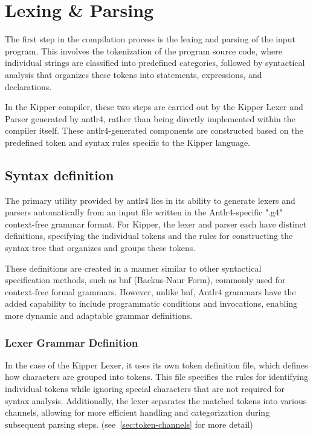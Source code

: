 \section{Lexing \& Parsing}
\label{sec:lexing-parsing}

The first step in the compilation process is the lexing and parsing of the input program. This involves the tokenization of the program source code, where individual strings are classified into predefined categories, followed by syntactical analysis that organizes these tokens into statements, expressions, and declarations.

In the Kipper compiler, these two steps are carried out by the Kipper Lexer and Parser generated by \Gls{antlr4}, rather than being directly implemented within the compiler itself. These \Gls{antlr4}-generated components are constructed based on the predefined token and syntax rules specific to the Kipper language.

\subsection{Syntax definition}

The primary utility provided by \Gls{antlr4} lies in its ability to generate lexers and parsers automatically from an input file written in the Antlr4-specific ".g4" context-free grammar format. For Kipper, the lexer and parser each have distinct definitions, specifying the individual tokens and the rules for constructing the syntax tree that organizes and groups these tokens.

These definitions are created in a manner similar to other syntactical specification methods, such as \acrshort{bnf} (Backus-Naur Form), commonly used for context-free formal grammars. However, unlike \acrshort{bnf}, Antlr4 grammars have the added capability to include programmatic conditions and invocations, enabling more dynamic and adaptable grammar definitions.

\subsubsection{Lexer Grammar Definition}
\label{sec:lexer-grammar-definition}

In the case of the Kipper Lexer, it uses its own token definition file, which defines how characters are grouped into tokens. This file specifies the rules for identifying individual tokens while ignoring special characters that are not required for syntax analysis. Additionally, the lexer separates the matched tokens into various channels, allowing for more efficient handling and categorization during subsequent parsing steps. (see~\ref{sec:token-channels} for more detail)

